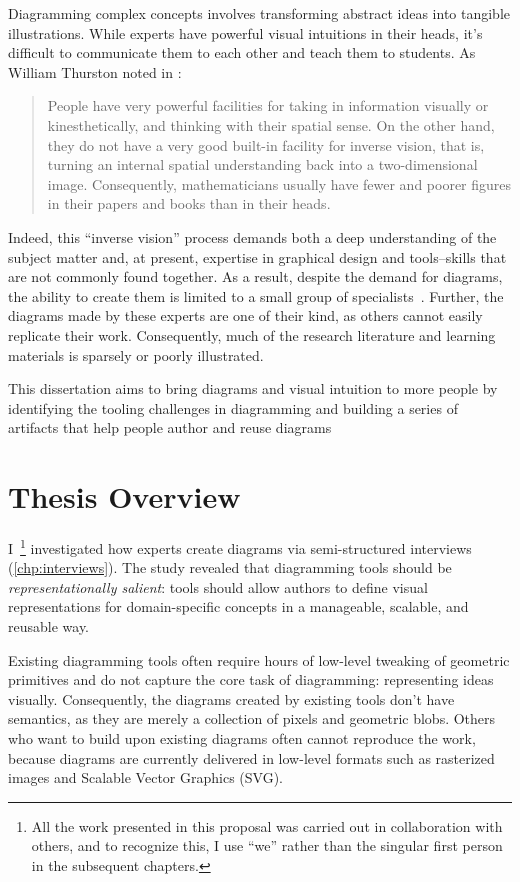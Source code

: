Diagramming complex concepts involves transforming abstract ideas into tangible illustrations. While experts have powerful visual intuitions in their heads, it's difficult to communicate them to each other and teach them to students. As William Thurston noted in :
\begin{quote}
   People have very powerful facilities for taking in information visually or kinesthetically, and thinking with their spatial sense. On the other hand, they do not have a very good built-in facility for inverse vision, that is, turning an internal spatial understanding back into a two-dimensional image. Consequently, mathematicians usually have fewer and poorer figures in their papers and books than in their heads.~\cite{thurston_proof_1994}
\end{quote}
\noindent
Indeed, this ``inverse vision'' process demands both a deep understanding of the subject matter and, at present, expertise in graphical design and tools--skills that are not commonly found together. As a result, despite the demand for diagrams, the ability to create them is limited to a small group of specialists~\cite{coulon_importance_2024}. Further, the diagrams made by these experts are one of their kind, as others cannot easily replicate their work. Consequently, much of the research literature and learning materials is sparsely or poorly illustrated.

This dissertation aims to bring diagrams and visual intuition to more people by identifying the tooling challenges in diagramming and building a series of artifacts that help people author and reuse diagrams

\section{Thesis Overview}

I~\footnote{All the work presented in this proposal was carried out in collaboration with others, and to recognize this, I use ``we'' rather than the singular first person in the subsequent chapters.} investigated how experts create diagrams via semi-structured interviews (\cref{chp:interviews}). The study revealed that diagramming tools should be \textit{representationally salient}: tools should allow authors to define visual representations for domain-specific concepts in a manageable, scalable, and reusable way. 

Existing diagramming tools often require hours of low-level tweaking of geometric primitives and do not capture the core task of diagramming: representing ideas visually. Consequently, the diagrams created by existing tools don't have semantics, as they are merely a collection of pixels and geometric blobs. Others who want to build upon existing diagrams often cannot reproduce the work, because diagrams are currently delivered in low-level formats such as rasterized images and Scalable Vector Graphics (SVG). 

